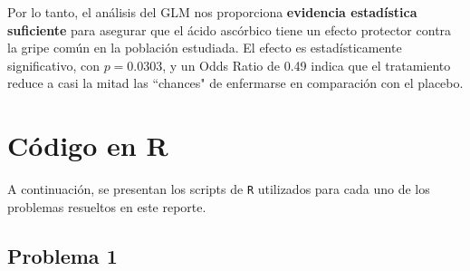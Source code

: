 \begin{tcolorbox}
Por lo tanto, el análisis del GLM nos proporciona \textbf{evidencia estadística suficiente} para asegurar que el ácido ascórbico tiene un efecto protector contra la gripe común en la población estudiada. El efecto es estadísticamente significativo, con $p = 0.0303$, y un Odds Ratio de 0.49 indica que el tratamiento reduce a casi la mitad las ``chances" de enfermarse en comparación con el placebo.
\end{tcolorbox}

\newpage

\appendix  
\section{Código en \textcolor{CIMATRed}{R}}

A continuación, se presentan los scripts de \texttt{R} utilizados para cada uno de los problemas resueltos en este reporte.


\subsection{Problema \textcolor{CIMATRed}{1}}

